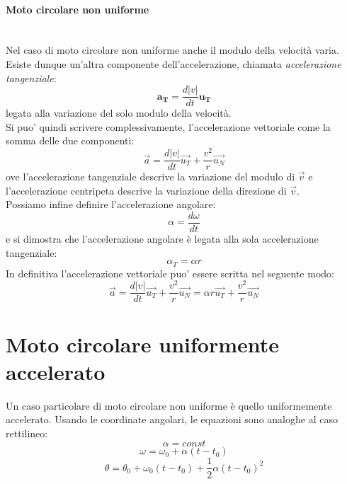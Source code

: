 \documentclass[12pt]{report}
\begin{document}
	\paragraph{Moto circolare non uniforme} \quad \\
	Nel caso di moto circolare non uniforme anche il modulo della velocità varia. Esiste dunque un'altra componente dell'accelerazione, chiamata \textit{accelerazione tangenziale}:
	\[
	\mathbf{a_T} = \frac{d|v|}{dt}\mathbf{u_T}
	\]
	legata alla variazione del solo modulo della velocità. \\
	Si puo' quindi scrivere complessivamente, l'accelerazione vettoriale come la somma delle due componenti:
	\[
	\vec{a} = \frac{d|v|}{dt}\vec{u_T} + \frac{v^2}{r}\vec{u_N}
	\]
	ove l'accelerazione tangenziale descrive la variazione del modulo di $\vec{v}$ e l'accelerazione centripeta descrive la variazione della direzione di $\vec{v}$.\\
	Possiamo infine definire l'accelerazione angolare:
	\[
	\alpha = \frac{d\omega}{dt}
	\]
	e si dimostra che l'accelerazione angolare è  legata alla sola accelerazione tangenziale:
	\[
	\alpha_T = \alpha r
	\]
	In definitiva l'accelerazione vettoriale puo' essere scritta nel seguente modo:
	\[
	\vec{a} = \frac{d|v|}{dt}\vec{u_T} + \frac{v^2}{r}\vec{u_N} = \alpha r \vec{u_T} + \frac{v^2}{r}\vec{u_N}
	\]
	\section{Moto circolare uniformente accelerato}
	Un caso particolare di moto circolare non uniforme è  quello uniformemente accelerato. Usando le coordinate angolari, le equazioni sono analoghe al caso rettilineo:
	\[
	\alpha = const
	\]
	\[
	\omega = \omega_0 + \alpha(t -t_0)
	\]
	\[
	\theta = \theta_0 + \omega_0(t - t_0) + \frac{1}{2}\alpha(t - t_0)^2
	\]
\end{document}
